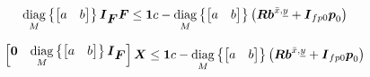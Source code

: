 \begin{equation*}
    \diag{M}{\begin{bmatrix} a & b \end{bmatrix}}
    \M{I}_{\FD}
    \FD
    \le
    \M{1} c 
    -
    \diag{M}{\begin{bmatrix} a & b \end{bmatrix}}
    \left(
        \M{R}
        \V{b}^{\bar{x},\underline{y}}
        +
        \M{I}_{fp0}
        \fp_0
    \right)
\end{equation*}


\begin{equation*}
    \begin{bmatrix}
        \M{0} & \diag{M}{\begin{bmatrix} a & b \end{bmatrix}} \M{I}_{\FD}
    \end{bmatrix}
    \M{X}
    \le
    \M{1} c 
    -
    \diag{M}{\begin{bmatrix} a & b \end{bmatrix}}
    \left(
        \M{R}
        \V{b}^{\bar{x},\underline{y}}
        +
        \M{I}_{fp0}
        \fp_0
    \right)
\end{equation*}

